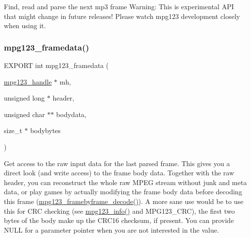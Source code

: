 Find, read and parse the next mp3 frame Warning\+: This is experimental A\+PI that might change in future releases! Please watch mpg123 development closely when using it. \mbox{\label{group__mpg123__input_ga372652321c0daf692a82734e19926189}} 
\subsubsection{\texorpdfstring{mpg123\+\_\+framedata()}{mpg123\_framedata()}}
{\footnotesize\ttfamily E\+X\+P\+O\+RT int mpg123\+\_\+framedata (\begin{DoxyParamCaption}\item[{\hyperlink{group__mpg123__init_ga6728e2839a395f3a07d4514da659faca}{mpg123\+\_\+handle} $\ast$}]{mh,  }\item[{unsigned long $\ast$}]{header,  }\item[{unsigned char $\ast$$\ast$}]{bodydata,  }\item[{size\+\_\+t $\ast$}]{bodybytes }\end{DoxyParamCaption})}

Get access to the raw input data for the last parsed frame. This gives you a direct look (and write access) to the frame body data. Together with the raw header, you can reconstruct the whole raw M\+P\+EG stream without junk and meta data, or play games by actually modifying the frame body data before decoding this frame (\hyperlink{group__mpg123__input_ga56bdb2367d228a0488eb58bce0d4c62b}{mpg123\+\_\+framebyframe\+\_\+decode()}). A more sane use would be to use this for C\+RC checking (see \hyperlink{group__mpg123__status_gad95415748b8b1bb0addcea7119435a91}{mpg123\+\_\+info()} and M\+P\+G123\+\_\+\+C\+RC), the first two bytes of the body make up the C\+R\+C16 checksum, if present. You can provide N\+U\+LL for a parameter pointer when you are not interested in the value.


